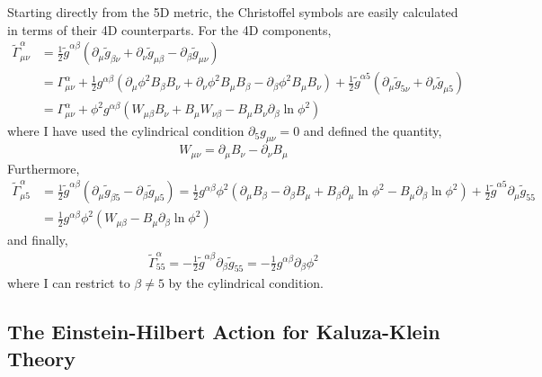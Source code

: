 \documentclass[11pt, a4paper]{article}
\begin{document}
Starting directly from the 5D metric, the Christoffel symbols are easily calculated in terms of their 4D counterparts. For the 4D components,
\begin{align*}
\tilde{\Gamma}^{\alpha}_{\mu \nu} & = \frac{1}{2} \tilde{g}^{\alpha \beta} \left( \partial_\mu \tilde{g}_{\beta \nu} + \partial_{\nu} \tilde{g}_{\mu \beta} - \partial_{\beta} \tilde{g}_{\mu \nu} \right)
\\
& = \Gamma^\alpha_{\mu \nu}  + \frac{1}{2} g^{\alpha \beta} \left( \partial_\mu \phi^2 B_\beta B_\nu + \partial_\nu \phi^2 B_\mu B_\beta - \partial_\beta \phi^2 B_\mu B_\nu \right) + \frac{1}{2} \tilde{g}^{\alpha 5} \left( \partial_\mu \tilde{g}_{5 \nu} + \partial_\nu \tilde{g}_{\mu 5} \right) 
\\
& = \Gamma^\alpha_{\mu \nu} + \phi^2 g^{\alpha \beta} \left(W_{\mu \beta} B_\nu + B_\mu W_{\nu \beta} - B_\mu B_\nu \partial_\beta \ln{\phi^2} \right)
\end{align*}
where I have used the cylindrical condition $\partial_5 g_{\mu \nu} = 0$ and defined the quantity,
\[ W_{\mu \nu} = \partial_\mu B_\nu - \partial_\nu B_\mu \]
Furthermore,
\begin{align*} 
\tilde{\Gamma}^\alpha_{\mu 5} & = \frac{1}{2} \tilde{g}^{\alpha \beta} \left( \partial_\mu \tilde{g}_{\beta 5} - \partial_\beta \tilde{g}_{\mu 5}  \right) = \frac{1}{2} g^{\alpha \beta} \phi^2 \left( \partial_\mu B_\beta - \partial_\beta B_\mu + B_\beta \partial_\mu \ln{\phi^2} - B_\mu \partial_\beta \ln{\phi^2}  \right) + \frac{1}{2} \tilde{g}^{\alpha 5} \partial_{\mu} \tilde{g}_{55}
\\
& = \frac{1}{2} g^{\alpha \beta} \phi^2 \left( W_{\mu \beta} - B_\mu \partial_\beta \ln{\phi^2}  \right) 
\end{align*}
and finally,
\begin{align*}
\tilde{\Gamma}^\alpha_{55} = - \frac{1}{2} \tilde{g}^{\alpha \beta} \partial_{\beta} \tilde{g}_{55} = - \frac{1}{2} g^{\alpha \beta} \partial_{\beta} \phi^2
\end{align*}
where I can restrict to $\beta \neq 5$ by the cylindrical condition.


\subsection{The Einstein-Hilbert Action for Kaluza-Klein Theory}
\end{document}
